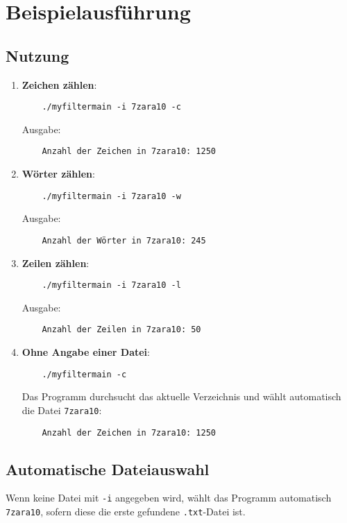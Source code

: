 \documentclass[10pt]{article} %
\begin{document}
\section{Beispielausführung}
\subsection{Nutzung}
\begin{enumerate}
    \item \textbf{Zeichen zählen}:
    \begin{verbatim}
    ./myfiltermain -i 7zara10 -c
    \end{verbatim}
    Ausgabe:
    \begin{verbatim}
    Anzahl der Zeichen in 7zara10: 1250
    \end{verbatim}

    \item \textbf{Wörter zählen}:
    \begin{verbatim}
    ./myfiltermain -i 7zara10 -w
    \end{verbatim}
    Ausgabe:
    \begin{verbatim}
    Anzahl der Wörter in 7zara10: 245
    \end{verbatim}

    \item \textbf{Zeilen zählen}:
    \begin{verbatim}
    ./myfiltermain -i 7zara10 -l
    \end{verbatim}
    Ausgabe:
    \begin{verbatim}
    Anzahl der Zeilen in 7zara10: 50
    \end{verbatim}

    \item \textbf{Ohne Angabe einer Datei}:
    \begin{verbatim}
    ./myfiltermain -c
    \end{verbatim}
    Das Programm durchsucht das aktuelle Verzeichnis und wählt automatisch die Datei \texttt{7zara10}:
    \begin{verbatim}
    Anzahl der Zeichen in 7zara10: 1250
    \end{verbatim}
\end{enumerate}

\subsection{Automatische Dateiauswahl}
Wenn keine Datei mit \texttt{-i} angegeben wird, wählt das Programm automatisch \texttt{7zara10}, sofern diese die erste gefundene \texttt{.txt}-Datei ist.
\end{document}
